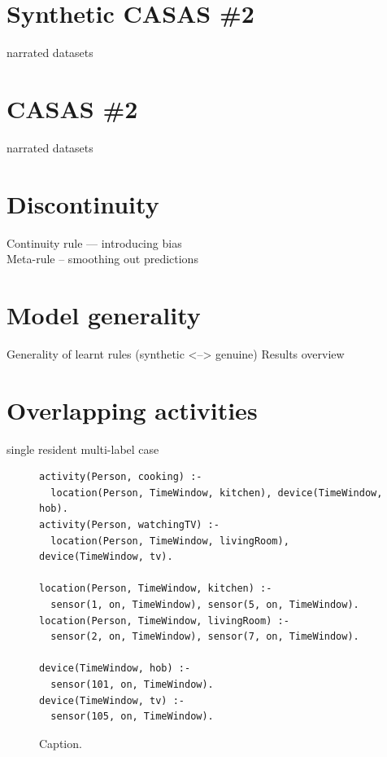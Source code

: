 \documentclass[12pt, a4paper, pdflatex, leqno, twoside, openright]{report}
\begin{document}
  \section{Synthetic CASAS \#2}
narrated datasets
  \section{CASAS \#2}
narrated datasets
  \section{Discontinuity}
Continuity rule --- introducing bias\\
Meta-rule -- smoothing out predictions
  \section{Model generality}
Generality of learnt rules (synthetic <--> genuine) Results overview
  \section{Overlapping activities}
single resident multi-label case


\begin{figure}[htb] %
  \begin{verbatim}
activity(Person, cooking) :-
  location(Person, TimeWindow, kitchen), device(TimeWindow, hob).
activity(Person, watchingTV) :-
  location(Person, TimeWindow, livingRoom), device(TimeWindow, tv).

location(Person, TimeWindow, kitchen) :-
  sensor(1, on, TimeWindow), sensor(5, on, TimeWindow).
location(Person, TimeWindow, livingRoom) :-
  sensor(2, on, TimeWindow), sensor(7, on, TimeWindow).

device(TimeWindow, hob) :-
  sensor(101, on, TimeWindow).
device(TimeWindow, tv) :-
  sensor(105, on, TimeWindow).
  \end{verbatim}
  \caption{Caption.\label{lst:label}}
\end{figure}
\end{document}
